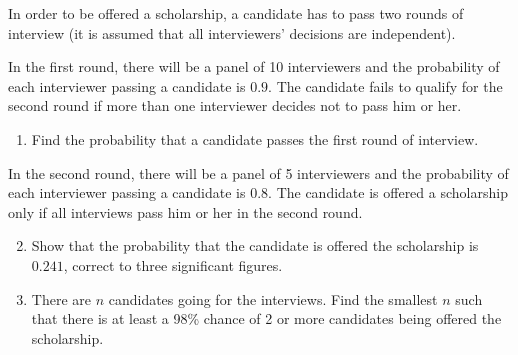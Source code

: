 \begin{problem}
    In order to be offered a scholarship, a candidate has to pass two rounds of interview (it is assumed that all interviewers' decisions are independent).

    In the first round, there will be a panel of 10 interviewers and the probability of each interviewer passing a candidate is $0.9$. The candidate fails to qualify for the second round if more than one interviewer decides not to pass him or her.

    \begin{enumerate}
        \item Find the probability that a candidate passes the first round of interview.
    \end{enumerate}
    
    In the second round, there will be a panel of 5 interviewers and the probability of each interviewer passing a candidate is $0.8$. The candidate is offered a scholarship only if all interviews pass him or her in the second round.

    \begin{enumerate}
        \setcounter{enumi}{1}
        \item Show that the probability that the candidate is offered the scholarship is $0.241$, correct to three significant figures.
        \item There are $n$ candidates going for the interviews. Find the smallest $n$ such that there is at least a 98\% chance of 2 or more candidates being offered the scholarship.
    \end{enumerate}
\end{problem}


